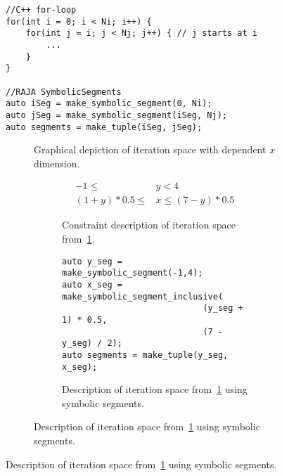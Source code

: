 \begin{figure}
\begin{lstlisting}[caption={Comparison of C++ for-loop and RAJA \texttt{SymbolicSegment} representations of a loop nest with a triangular iteration space.},label=triangularComparison]
//C++ for-loop
for(int i = 0; i < Ni; i++) {
	for(int j = i; j < Nj; j++) { // j starts at i
		... 
	}
}

//RAJA SymbolicSegments
auto iSeg = make_symbolic_segment(0, Ni);
auto jSeg = make_symbolic_segment(iSeg, Nj);
auto segments = make_tuple(iSeg, jSeg);
\end{lstlisting}
\end{figure}






\begin{figure}
\begin{subfigure}{0.4\columnwidth}
\caption{Graphical depiction of iteration space with dependent $x$ dimension.}\label{triangularIterationSpace1}
\end{subfigure}
\hspace{0.05\columnwidth}
\begin{subfigure}{0.55\columnwidth}
\begin{subfigure}{\columnwidth}
\begin{align}
	-1 \leq &y < 4 \\
	(1 + y) * 0.5 \leq &x \leq (7 - y) * 0.5
\end{align}
\caption{Constraint description of iteration space from~\ref{triangularIterationSpace1}.}\label{constraintDescription1}
\end{subfigure}

\vspace{20pt}

\begin{subfigure}{\columnwidth}
\begin{lstlisting}[]
auto y_seg = make_symbolic_segment(-1,4);
auto x_seg = make_symbolic_segment_inclusive(
							(y_seg + 1) * 0.5, 
							(7 - y_seg) / 2);
auto segments = make_tuple(y_seg, x_seg);
\end{lstlisting}
\caption{Description of iteration space from~\ref{triangularIterationSpace1} using symbolic segments.}\label{symseg1}
\end{subfigure}
\end{subfigure}


\end{figure}
